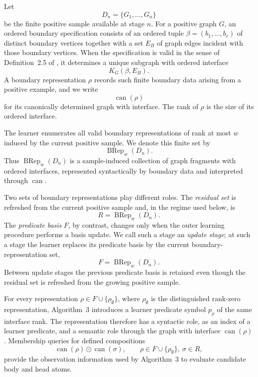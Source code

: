 \documentclass[11pt]{article}
\theoremstyle{definition}
\theoremstyle{remark}
\begin{document}
Let
\[
D_n=\{G_1,\ldots,G_n\}
\]
be the finite positive sample available at stage \(n\).  For a positive graph
\(G\), an ordered boundary specification consists of an ordered tuple
\(\beta=(b_1,\ldots,b_r)\) of distinct boundary vertices together with a set
\(E_B\) of graph edges incident with those boundary vertices.  When the
specification is valid in the sense of Definition~2.5 of
\cite{ShoudaiEtAl2026}, it determines a unique subgraph with ordered interface
\[
K_G(\beta,E_B).
\]
A boundary representation \(\rho\) records such finite boundary data arising
from a positive example, and we write
\[
\operatorname{can}(\rho)
\]
for its canonically determined graph with interface.  The rank of \(\rho\) is
the size of its ordered interface.

The learner enumerates all valid boundary representations of rank at most
\(w\) induced by the current positive sample.  We denote this finite set by
\[
\operatorname{BRep}_w(D_n).
\]
Thus \(\operatorname{BRep}_w(D_n)\) is a sample-induced collection of graph
fragments with ordered interfaces, represented syntactically by boundary data
and interpreted through \(\operatorname{can}\).

Two sets of boundary representations play different roles.  The
\emph{residual set} is refreshed from the current positive sample and, in the
regime used below, is
\[
R=\operatorname{BRep}_w(D_n).
\]
The \emph{predicate basis} \(F\), by contrast, changes only when the outer
learning procedure performs a basis update.  We call such a stage an
\emph{update stage}; at such a stage the learner replaces its predicate basis
by the current boundary-representation set,
\[
F=\operatorname{BRep}_w(D_n).
\]
Between update stages the previous predicate basis is retained even though the
residual set is refreshed from the growing positive sample.

For every representation
\(\rho\in F\cup\{\rho_\emptyset\}\), where
\(\rho_\emptyset\) is the distinguished rank-zero representation,
Algorithm~3 introduces a learner predicate symbol \(p_\rho\) of the same
interface rank.  The representation therefore has a syntactic role, as an
index of a learner predicate, and a semantic role through the graph with
interface \(\operatorname{can}(\rho)\).  Membership queries for defined
compositions
\[
\operatorname{can}(\rho)\odot\operatorname{can}(\sigma),
\qquad \rho\in F\cup\{\rho_\emptyset\},\ \sigma\in R,
\]
provide the observation information used by Algorithm~3 to evaluate candidate
body and head atoms.
\end{document}
